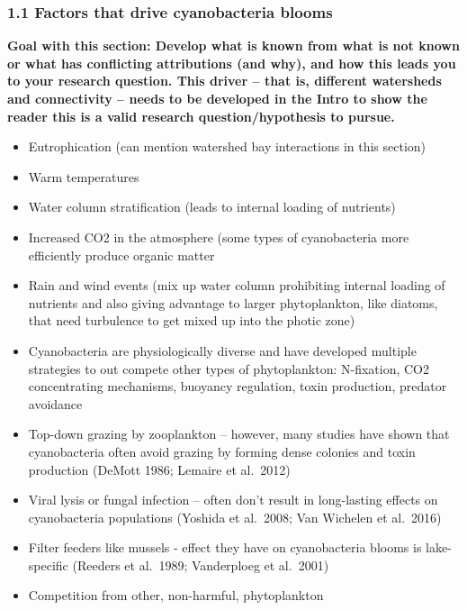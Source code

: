 \documentclass[]{article}
\providecommand{\tightlist}{%
  \setlength{\itemsep}{0pt}\setlength{\parskip}{0pt}}
\begin{document}
\hypertarget{factors-that-drive-cyanobacteria-blooms}{%
\subsubsection{1.1 Factors that drive cyanobacteria
blooms}\label{factors-that-drive-cyanobacteria-blooms}}

\textbf{Goal with this section: Develop what is known from what is not
known or what has conflicting attributions (and why), and how this leads
you to your research question. This driver -- that is, different
watersheds and connectivity -- needs to be developed in the Intro to
show the reader this is a valid research question/hypothesis to pursue.}

\begin{itemize}
\tightlist
\item
  Eutrophication (can mention watershed bay interactions in this
  section)
\item
  Warm temperatures
\item
  Water column stratification (leads to internal loading of nutrients)
\item
  Increased CO2 in the atmosphere (some types of cyanobacteria more
  efficiently produce organic matter
\item
  Rain and wind events (mix up water column prohibiting internal loading
  of nutrients and also giving advantage to larger phytoplankton, like
  diatoms, that need turbulence to get mixed up into the photic zone)
\item
  Cyanobacteria are physiologically diverse and have developed multiple
  strategies to out compete other types of phytoplankton: N-fixation,
  CO2 concentrating mechanisms, buoyancy regulation, toxin production,
  predator avoidance
\item
  Top-down grazing by zooplankton -- however, many studies have shown
  that cyanobacteria often avoid grazing by forming dense colonies and
  toxin production (DeMott 1986; Lemaire et al.~2012)
\item
  Viral lysis or fungal infection -- often don't result in long-lasting
  effects on cyanobacteria populations (Yoshida et al.~2008; Van
  Wichelen et al.~2016)
\item
  Filter feeders like mussels - effect they have on cyanobacteria blooms
  is lake-specific (Reeders et al.~1989; Vanderploeg et al.~2001)
\item
  Competition from other, non-harmful, phytoplankton
\end{itemize}
\end{document}
